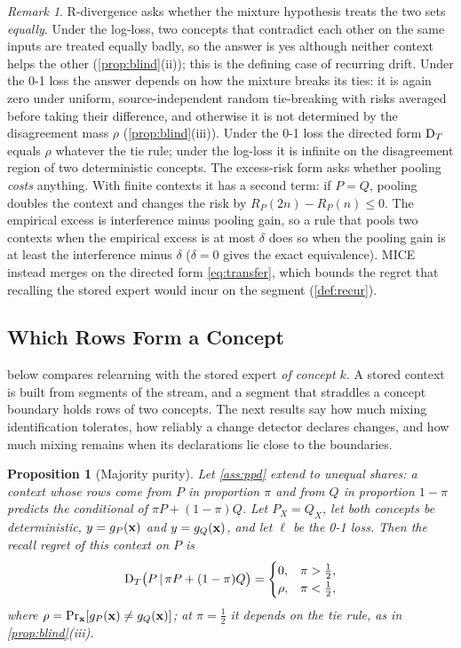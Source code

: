 \documentclass[11pt]{article}
\theoremstyle{plain}
\newtheorem{proposition}{Proposition}
\theoremstyle{definition}
\theoremstyle{remark}
\newtheorem{remark}{Remark}
\newcommand{\method}{\textsc{MICE}}   %
\begin{document}
\begin{remark}\label{rem:merge}
R-divergence asks whether the mixture hypothesis treats the two sets \emph{equally}. Under the log-loss, two
concepts that contradict each other on the same inputs are treated equally badly, so the answer is yes although
neither context helps the other (\cref{prop:blind}(ii)); this is the defining case of
recurring drift. Under the 0-1 loss the answer depends on how the mixture breaks its ties: it is again zero under
uniform, source-independent random tie-breaking with risks averaged before taking their difference, and otherwise it is not determined by the disagreement mass $\rho$ (\cref{prop:blind}(iii)). Under
the 0-1 loss the directed form $\mathrm{D}_T$ equals $\rho$ whatever the tie rule; under the log-loss it is infinite on the
disagreement region of two deterministic concepts. The excess-risk form asks whether pooling \emph{costs}
anything. With finite contexts it has a second term: if $P=Q$, pooling doubles the context and changes the risk by
$R_P(2n)-R_P(n)\le0$. The empirical excess is interference minus pooling gain, so a rule that pools two contexts
when the empirical excess is at most $\delta$ does so when the pooling gain is at least the interference minus
$\delta$ ($\delta=0$ gives the exact equivalence). \method{} instead merges on the directed form \eqref{eq:transfer},
which bounds the regret that recalling the stored expert would incur on the segment (\cref{def:recur}).
\end{remark}


\subsection{Which Rows Form a Concept}
\label{sec:th-seg}

 below compares relearning with the stored expert \emph{of concept $k$}. A stored context is built
from segments of the stream, and a segment that straddles a concept boundary holds rows of two concepts. The next
results say how much mixing identification tolerates, how reliably a change detector declares changes, and how
much mixing remains when its declarations lie close to the boundaries.

\begin{proposition}[Majority purity]\label{prop:purity}
Let \cref{ass:ppd} extend to unequal shares: a context whose rows come from $P$ in proportion $\pi$ and from $Q$ in
proportion $1-\pi$ predicts the conditional of $\pi P+(1-\pi)Q$. Let $P_X=Q_X$, let both concepts be deterministic,
$y=g_P(\mathbf{x})$ and $y=g_Q(\mathbf{x})$, and let $\ell$ be the 0-1 loss. Then the recall regret of this context on $P$ is
\[
  \mathrm{D}_T\bigl(P\,|\,\pi P+(1-\pi)Q\bigr)=
  \begin{cases}
    0, & \pi>\tfrac12,\\
    \rho, & \pi<\tfrac12,
  \end{cases}
\]
where $\rho=\Pr_{\mathbf{x}}[g_P(\mathbf{x})\ne g_Q(\mathbf{x})]$; at $\pi=\tfrac12$ it depends on the tie rule, as in
\cref{prop:blind}(iii).
\end{proposition}
\end{document}
